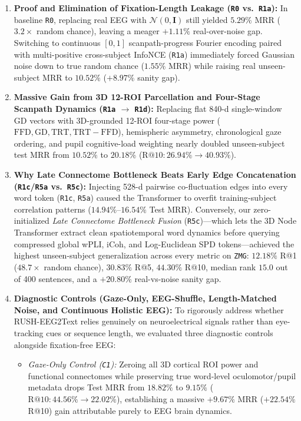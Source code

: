 \documentclass[journal]{IEEEtran}
\begin{document}
\begin{enumerate}
    \item \textbf{Proof and Elimination of Fixation-Length Leakage (\texttt{R0} vs.\ \texttt{R1a}):} In baseline \texttt{R0}, replacing real EEG with $\mathcal{N}(0,\mathbf{I})$ still yielded $5.29\%$ MRR ($3.2\times$ random chance), leaving a meager $+1.11\%$ real-over-noise gap. Switching to continuous $[0,1]$ scanpath-progress Fourier encoding paired with multi-positive cross-subject InfoNCE (\texttt{R1a}) immediately forced Gaussian noise down to true random chance ($1.55\%$ MRR) while raising real unseen-subject MRR to $10.52\%$ ($+8.97\%$ sanity gap).
    \item \textbf{Massive Gain from 3D 12-ROI Parcellation and Four-Stage Scanpath Dynamics (\texttt{R1a} $\rightarrow$ \texttt{R1d}):} Replacing flat 840-d single-window GD vectors with 3D-grounded 12-ROI four-stage power ($\text{FFD}, \text{GD}, \text{TRT}, \text{TRT}-\text{FFD}$), hemispheric asymmetry, chronological gaze ordering, and pupil cognitive-load weighting nearly doubled unseen-subject test MRR from $10.52\%$ to $20.18\%$ ($\text{R@10}: 26.94\% \rightarrow 40.93\%$).
    \item \textbf{Why Late Connectome Bottleneck Beats Early Edge Concatenation (\texttt{R1c}/\texttt{R5a} vs.\ \texttt{R5c}):} Injecting 528-d pairwise co-fluctuation edges into every word token (\texttt{R1c}, \texttt{R5a}) caused the Transformer to overfit training-subject correlation patterns ($14.94\%\text{--}16.54\%$ Test MRR). Conversely, our zero-initialized \textit{Late Connectome Bottleneck Fusion} (\texttt{R5c})---which lets the 3D Node Transformer extract clean spatiotemporal word dynamics before querying compressed global wPLI, iCoh, and Log-Euclidean SPD tokens---achieved the highest unseen-subject generalization across every metric on \texttt{ZMG}: $\mathbf{12.18\%}$ R@1 ($48.7\times$ random chance), $\mathbf{30.83\%}$ R@5, $\mathbf{44.30\%}$ R@10, median rank $\mathbf{15.0}$ out of 400 sentences, and a $+\mathbf{20.80\%}$ real-vs-noise sanity gap.
    \item \textbf{Diagnostic Controls (Gaze-Only, EEG-Shuffle, Length-Matched Noise, and Continuous Holistic EEG):} To rigorously address whether RUSH-EEG2Text relies genuinely on neuroelectrical signals rather than eye-tracking cues or sequence length, we evaluated three diagnostic controls alongside fixation-free EEG:
    \begin{itemize}
        \item \textit{Gaze-Only Control (\texttt{C1}):} Zeroing all 3D cortical ROI power and functional connectomes while preserving true word-level oculomotor/pupil metadata drops Test MRR from $18.82\%$ to $9.15\%$ ($\text{R@10}: 44.56\% \rightarrow 22.02\%$), establishing a massive $+\mathbf{9.67\%}$ MRR ($+\mathbf{22.54\%}$ R@10) gain attributable purely to EEG brain dynamics.

\end{itemize}
\end{enumerate}
\end{document}
